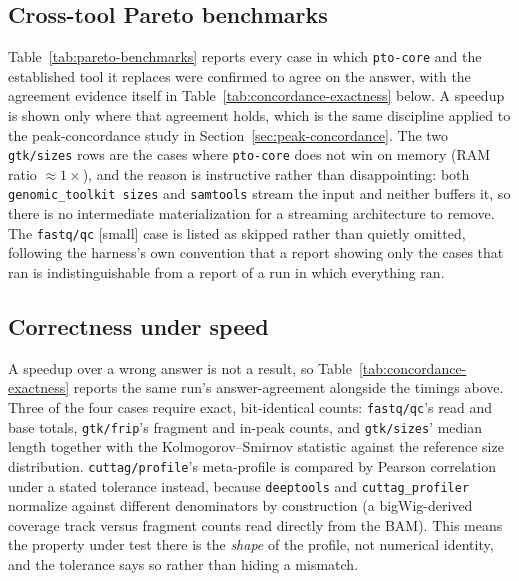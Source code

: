 \documentclass[10pt,twocolumn]{article}
\begin{document}
\subsection{Cross-tool Pareto benchmarks}



Table~\ref{tab:pareto-benchmarks} reports every case in which
\texttt{pto-core} and the established tool it replaces were confirmed to
agree on the answer, with the agreement evidence itself in
Table~\ref{tab:concordance-exactness} below. A speedup is shown only where
that agreement holds, which is the same discipline applied to the
peak-concordance study in Section~\ref{sec:peak-concordance}. The two
\texttt{gtk/sizes} rows are the cases where \texttt{pto-core} does not win on
memory (RAM ratio $\approx 1\times$), and the reason is instructive rather
than disappointing: both \texttt{genomic\_toolkit sizes} and
\texttt{samtools} stream the input and neither buffers it, so there is no
intermediate materialization for a streaming architecture to remove. The
\texttt{fastq/qc} [small] case is listed as skipped rather than quietly
omitted, following the harness's own convention that a report showing only
the cases that ran is indistinguishable from a report of a run in which
everything ran.

\subsection{Correctness under speed}



A speedup over a wrong answer is not a result, so
Table~\ref{tab:concordance-exactness} reports the same run's answer-agreement
alongside the timings above. Three of the four cases require exact,
bit-identical counts: \texttt{fastq/qc}'s read and base totals,
\texttt{gtk/frip}'s fragment and in-peak counts, and \texttt{gtk/sizes}'
median length together with the Kolmogorov--Smirnov statistic against the
reference size distribution. \texttt{cuttag/profile}'s meta-profile is
compared by Pearson correlation under a stated tolerance instead, because
\texttt{deeptools} and \texttt{cuttag\_profiler} normalize against different
denominators by construction (a bigWig-derived coverage track versus fragment
counts read directly from the BAM). This means the property under test there
is the \emph{shape} of the profile, not numerical identity, and the tolerance
says so rather than hiding a mismatch.
\end{document}
